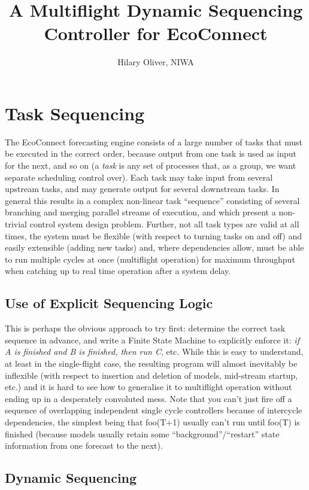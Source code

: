 \documentclass[12pt]{article}
\title{A Multiflight Dynamic Sequencing Controller for EcoConnect}
\author{Hilary Oliver, NIWA}
\begin{document}
\maketitle

\section{Task Sequencing} 

The EcoConnect forecasting engine consists of a large number of tasks
that must be executed in the correct order, because output from one task
is used as input for the next, and so on (a {\em task} is any set of
processes that, as a group, we want separate scheduling control over).
Each task may take input from several upstream tasks, and may generate
output for several downstream tasks. In general this results in a
complex non-linear task ``sequence'' consisting of several branching and
merging parallel streams of execution, and which present a non-trivial
control system design problem. Further, not all task types are valid at
all times, the system must be flexible (with respect to turning tasks on
and off) and easily extensible (adding new tasks) and, where
dependencies allow, must be able to run multiple cycles at once
(multiflight operation) for maximum throughput when catching up to real
time operation after a system delay. 


\subsection{Use of Explicit Sequencing Logic}

This is perhaps the obvious approach to try first: determine the correct
task sequence in advance, and write a Finite State Machine to explicitly
enforce it: {\em if A is finished and B is finished, then run C}, etc.
While this is easy to understand, at least in the single-flight case,
the resulting program will almost inevitably be inflexible (with respect
to insertion and deletion of models, mid-stream startup, etc.) and it is
hard to see how to generalise it to multiflight operation without ending
up in a desperately convoluted mess. Note that you can't just fire off a
sequence of overlapping independent single cycle controllers because of
intercycle dependencies, the simplest being that foo(T+1) usually can't
run until foo(T) is finished (because models usually retain some
``background''/``restart'' state information from one forecast to the
next). 


\subsection{Dynamic Sequencing}
\end{document}
